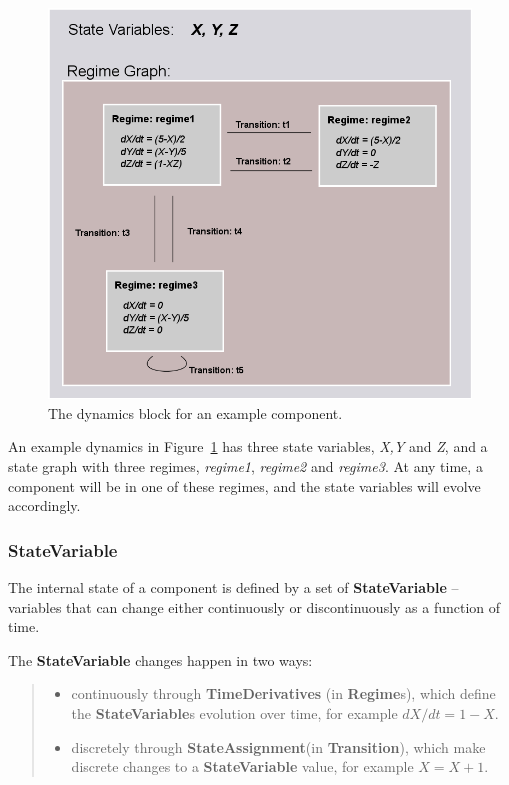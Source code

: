 \documentclass{article}
\newcommand{\StateVariable}{{\bf{StateVariable}}\xspace}
\newcommand{\StateVariables}{{\bf{StateVariable}}s\xspace}
\newcommand{\StateAssignment}{{\bf{StateAssignment}}\xspace}
\newcommand{\Regimes}{{\bf{Regime}}s\xspace}
\newcommand{\Transition}{{\bf{Transition}}\xspace}
\begin{document}
\begin{figure}[htb!]
\center
\includegraphics[width=14cm]{images/SimpleRegimeGraph.png}
\protect\caption{The dynamics block for an example component.}
\label{SimpleRegimeGraph}
\end{figure}

An example dynamics in Figure~\ref{SimpleRegimeGraph} has three state variables,
\emph{X,Y} and \emph{Z}, and a state graph with three regimes, \emph{regime1},
\emph{regime2} and \emph{regime3}. At any time, a component will be in one of
these regimes, and the state variables will evolve accordingly.

\subsubsection{StateVariable}

The internal state of a component is defined by a set of \StateVariable
-- variables that can change either continuously or discontinuously as a
function of time.

The \StateVariable changes happen in two ways:
%
\begin{quote}
\begin{itemize}
\item continuously through \textbf{TimeDerivatives} (in \Regimes),
which define the \StateVariables evolution over time, for example
$dX/dt=1-X$.
\item discretely through \StateAssignment (in \Transition),
which make discrete changes to a \StateVariable value, for example
$X = X + 1$.
\end{itemize}
\end{quote}
\end{document}
